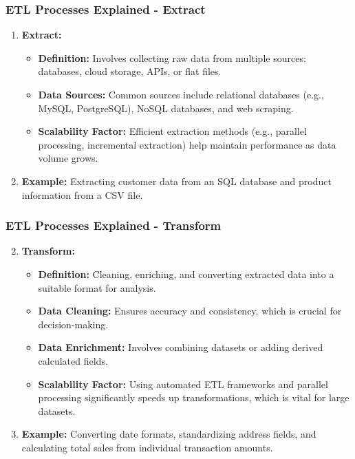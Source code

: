 \documentclass[aspectratio=169]{beamer}
\begin{document}
\begin{frame}[fragile]
    \frametitle{ETL Processes Explained - Extract}
    \begin{enumerate}
        \item \textbf{Extract:}
        \begin{itemize}
            \item \textbf{Definition:} Involves collecting raw data from multiple sources: databases, cloud storage, APIs, or flat files.
            \item \textbf{Data Sources:} Common sources include relational databases (e.g., MySQL, PostgreSQL), NoSQL databases, and web scraping.
            \item \textbf{Scalability Factor:} Efficient extraction methods (e.g., parallel processing, incremental extraction) help maintain performance as data volume grows.
        \end{itemize}
        \item \textbf{Example:} Extracting customer data from an SQL database and product information from a CSV file.
    \end{enumerate}
\end{frame}

\begin{frame}[fragile]
    \frametitle{ETL Processes Explained - Transform}
    \begin{enumerate}
        \setcounter{enumii}{1} %
        \item \textbf{Transform:}
        \begin{itemize}
            \item \textbf{Definition:} Cleaning, enriching, and converting extracted data into a suitable format for analysis.
            \item \textbf{Data Cleaning:} Ensures accuracy and consistency, which is crucial for decision-making.
            \item \textbf{Data Enrichment:} Involves combining datasets or adding derived calculated fields.
            \item \textbf{Scalability Factor:} Using automated ETL frameworks and parallel processing significantly speeds up transformations, which is vital for large datasets.
        \end{itemize}
        \item \textbf{Example:} Converting date formats, standardizing address fields, and calculating total sales from individual transaction amounts.
    \end{enumerate}
\end{frame}
\end{document}
